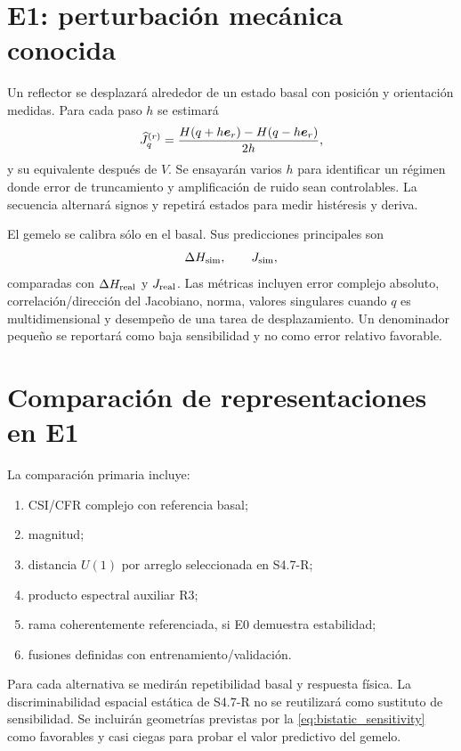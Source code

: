 \section{E1: perturbación mecánica conocida}

Un reflector se desplazará alrededor de un estado basal con posición y orientación medidas. Para cada paso $h$ se estimará
\begin{equation}
\widehat J_q^{(r)}=\frac{H(q+h\bm{e}_r)-H(q-h\bm{e}_r)}{2h},
\label{eq:finite_difference_jacobian}
\end{equation}
y su equivalente después de $V$. Se ensayarán varios $h$ para identificar un régimen donde error de truncamiento y amplificación de ruido sean controlables. La secuencia alternará signos y repetirá estados para medir histéresis y deriva.

El gemelo se calibra sólo en el basal. Sus predicciones principales son
\begin{equation}
\Delta H_{\rm sim},\qquad J_{\rm sim},
\end{equation}
comparadas con $\Delta H_{\rm real}$ y $J_{\rm real}$. Las métricas incluyen error complejo absoluto, correlación/dirección del Jacobiano, norma, valores singulares cuando $q$ es multidimensional y desempeño de una tarea de desplazamiento. Un denominador pequeño se reportará como baja sensibilidad y no como error relativo favorable.

\section{Comparación de representaciones en E1}

La comparación primaria incluye:
\begin{enumerate}
\item CSI/CFR complejo con referencia basal;
\item magnitud;
\item distancia $U(1)$ por arreglo seleccionada en S4.7-R;
\item producto espectral auxiliar R3;
\item rama coherentemente referenciada, si E0 demuestra estabilidad;
\item fusiones definidas con entrenamiento/validación.
\end{enumerate}
Para cada alternativa se medirán repetibilidad basal y respuesta física. La discriminabilidad espacial estática de S4.7-R no se reutilizará como sustituto de sensibilidad. Se incluirán geometrías previstas por la \cref{eq:bistatic_sensitivity} como favorables y casi ciegas para probar el valor predictivo del gemelo.

